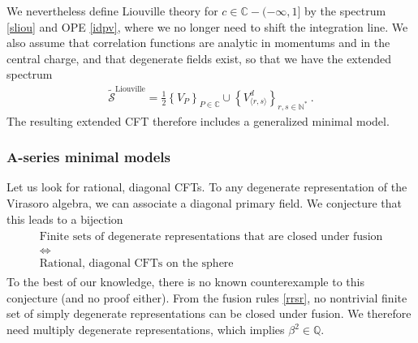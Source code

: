 \documentclass[12pt, a4paper]{article}
\theoremstyle{break}
\begin{document}
We nevertheless define Liouville theory for $c\in\mathbb{C}-(-\infty,1]$ by the spectrum \eqref{sliou} and OPE \eqref{idpv}, where we no longer need to shift the integration line. 
We also assume that correlation functions are analytic in momentums and in the central charge, and that degenerate fields exist, so that we have the extended spectrum
\begin{align}
 \boxed{ \widetilde{\mathcal{S}}^\text{Liouville} = \frac12 \left\{ V_P\right\}_{P\in \mathbb{C}} \cup \left\{ V^d_{\langle r,s\rangle}\right\}_{r,s\in\mathbb{N}^*} }\ .
 \label{stliou}
\end{align}
The resulting extended CFT therefore includes a generalized minimal model. 


\subsubsection{A-series minimal models}\label{sec:amm}

Let us look for rational, diagonal CFTs. 
To any degenerate representation of the Virasoro algebra, we can associate a diagonal primary field. We conjecture that this leads to a bijection 
\begin{align}
\begin{array}{c}
 \text{Finite sets of degenerate representations that are closed under fusion}
 \\
 \iff 
 \\
 \text{Rational, diagonal CFTs on the sphere}
\end{array}
\end{align}
To the best of our knowledge, there is no known counterexample to this conjecture (and no proof either). 
From the fusion rules \eqref{rrsr}, no nontrivial finite set of simply degenerate representations can be closed under fusion. We therefore need multiply degenerate representations, which implies $\beta^2\in\mathbb{Q}$.  
\end{document}
